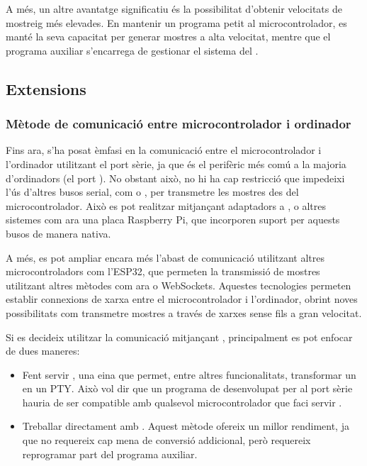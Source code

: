 \documentclass{tfgitic}[2023/06/30]
\begin{document}
A més, un altre avantatge significatiu és la possibilitat d'obtenir
velocitats de mostreig més elevades. En mantenir un programa petit al
microcontrolador, es manté la seva capacitat per generar mostres a
alta velocitat, mentre que el programa auxiliar s'encarrega de
gestionar el sistema del .

\subsection{Extensions}
\label{subsec:extensions-osplot-pc}

\subsubsection{Mètode de comunicació entre microcontrolador i ordinador}

Fins ara, s'ha posat èmfasi en la comunicació entre el
microcontrolador i l'ordinador utilitzant el port sèrie, ja que és el
perifèric més comú a la majoria d'ordinadors (el port ). No
obstant això, no hi ha cap restricció que impedeixi l'ús d'altres
busos serial, com  o , per transmetre les mostres
des del microcontrolador. Això es pot realitzar mitjançant adaptadors
a , o altres sistemes com ara una placa Raspberry Pi, que
incorporen suport per aquests busos de manera nativa.

A més, es pot ampliar encara més l'abast de comunicació utilitzant
altres microcontroladors com l'ESP32, que permeten la transmissió de
mostres utilitzant altres mètodes com ara  
o WebSockets. Aquestes tecnologies permeten establir connexions de
xarxa entre el microcontrolador i l'ordinador, obrint noves
possibilitats com transmetre mostres a través de xarxes sense fils a
gran velocitat.

Si es decideix utilitzar la comunicació mitjançant ,
principalment es pot enfocar de dues maneres:

\begin{itemize}
	\item Fent servir \cite[socat]{socat}, una eina que permet,
          entre altres funcionalitats, transformar un  en
          un PTY. Això vol dir que un programa de 
          desenvolupat per al port sèrie hauria de ser compatible amb
          qualsevol microcontrolador que faci servir .
	\item Treballar directament amb . Aquest mètode
          ofereix un millor rendiment, ja que no requereix cap mena de
          conversió addicional, però requereix reprogramar part del
          programa auxiliar.
\end{itemize}
\end{document}
